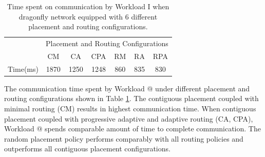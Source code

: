 \documentclass[conference,compsoc]{IEEEtran}
\makeatletter
\newcommand{\Rmnum}[1]{\expandafter\@slowromancap\romannumeral #1@}
\makeatother
\begin{document}
\begin{table}[ht]
\begin{center}
\caption{Time spent on communication by Workload I when dragonfly network equipped with 6 different placement and routing configurations.} 
\label{tab:wkld-commtime}
\begin{tabular}{l c c c c c c }
\toprule %
\toprule
&\multicolumn{6}{c}{Placement and Routing Configurations} \\ %
\cmidrule(l){2-7}
	 & CM & CA & CPA & RM & RA & RPA \\ %
\midrule %
Time(ms)  &  1870 & 1250 & 1248 & 860 & 835 &830\\ %

\midrule %
\bottomrule %
\end{tabular}
\end{center}
\end{table}

The communication time spent by Workload \Rmnum{1} under different placement and routing configurations shown in Table \ref{tab:wkld-commtime}. The contiguous placement coupled with minimal routing (CM) results in highest communication time. When contiguous placement coupled with progressive adaptive and adaptive routing (CA, CPA), Workload \Rmnum{1} spends  comparable amount of time to complete communication. The random placement policy performs comparably with all routing policies and outperforms all contiguous placement configurations.
\end{document}
